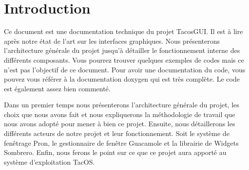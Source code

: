 \section{Introduction}

Ce document est une documentation technique du projet TacosGUI.
Il est à lire après notre état de l'art sur les interfaces graphiques.
Nous présenterons l'architecture générale du projet jusqu'à détailler le fonctionnement interne des différents composants.
Vous pourrez trouver quelques exemples de codes mais ce n'est pas l'objectif de ce document.
Pour avoir une documentation du code, vous pouvez vous référer à la documentation doxygen qui est très complète.
Le code est également assez bien commenté.

Dans un premier temps nous présenterons l'architecture générale du projet, les choix que nous avons fait et nous expliquerons la méthodologie de travail que nous avons adopté pour mener à bien ce projet.
Ensuite, nous détaillerons les différents acteurs de notre projet et leur fonctionnement.
Soit le système de fenêtrage Pron, le gestionnaire de fenêtre Guacamole et la librairie de Widgets Sombrero.
Enfin, nous ferons le point sur ce que ce projet aura apporté au système d'exploitation TacOS.